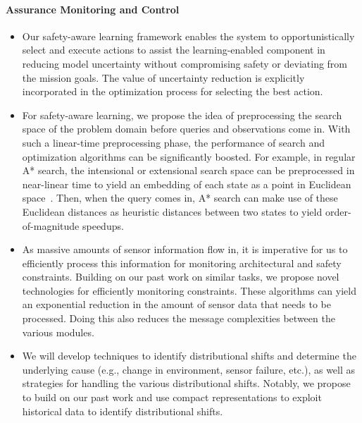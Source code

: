 \documentclass[12pt]{dod-blank}
\begin{document}
\paragraph{Assurance Monitoring and Control}

\begin{itemize}[itemsep=0pt,leftmargin=*]
\item 
Our safety-aware learning framework enables the system to opportunistically select and execute actions to assist the learning-enabled component in reducing model uncertainty without compromising safety or deviating from the mission goals. The value of uncertainty reduction is explicitly incorporated in the optimization process for selecting the best action.  
\item For safety-aware learning, we propose the idea of preprocessing the search space of the problem domain before queries and observations come in. With such a linear-time preprocessing phase, the performance of search and optimization algorithms can be significantly boosted. For example, in regular A* search, the intensional or extensional search space can be preprocessed in near-linear time to yield an embedding of each state as a point in Euclidean space~\cite{cujakk}. Then, when the query comes in, A* search can make use of these Euclidean distances as heuristic distances between two states to yield order-of-magnitude speedups. 
\item As massive amounts of sensor information flow in, it is imperative for us to efficiently process this information for monitoring architectural and safety constraints. Building on our past work on similar tasks, we propose novel technologies for efficiently monitoring constraints. These algorithms can yield an exponential reduction in the amount of sensor data that needs to be processed. Doing this also reduces the message complexities between the various modules. %
\item We will develop techniques to identify  distributional shifts and determine the underlying cause (e.g., change in environment, sensor failure,   etc.), as well as strategies for handling the various distributional shifts.   Notably, we propose to build on our past work and use compact representations to exploit historical data to identify distributional shifts.
\end{itemize}
\end{document}
